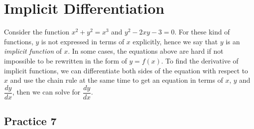 \documentclass[12pt]{report}
\begin{document}
\newpage
\section{Implicit Differentiation}

Consider the function $x^2 + y^2 = x^3$ and $y^2 - 2xy - 3 = 0$. For these kind
of functions, $y$ is not expressed in terms of $x$ explicitly, hence we say
that $y$ is an \textit{implicit function} of $x$. In some cases, the equations
above are hard if not impossible to be rewritten in the form of $y = f (x)$. To
find the derivative of implicit functions, we can differentiate both sides of
the equation with respect to $x$ and use the chain rule at the same time to get
an equation in terms of $x$, $y$ and $\dfrac{dy}{dx}$, then we can solve for
$\dfrac{dy}{dx}$.

\subsection{Practice 7}
\end{document}
